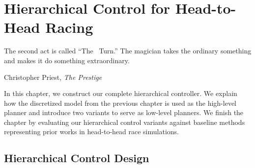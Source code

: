 \chapter{Hierarchical Control for Head-to-Head Racing} 
\epigraph{\flushright The second act is called ``The~ Turn.'' The magician takes the ordinary something and makes it do something extraordinary.}{Christopher Priest, \textit{The Prestige}}
\label{chapter:hier}
In this chapter, we construct our complete hierarchical controller. We explain how the discretized model from the previous chapter is used as the high-level planner and introduce two variants to serve as low-level planners. We finish the chapter by evaluating our hierarchical control variants against baseline methods representing prior works in head-to-head race simulations.
\section{Hierarchical Control Design}

